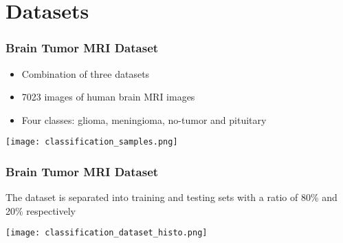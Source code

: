 \documentclass[../presentation.tex]{subfiles} %
\begin{document}
\section{Datasets}

\begin{frame}

    \frametitle{Brain Tumor MRI Dataset}

    \begin{cbox}
        \begin{itemize}
            \item Combination of three datasets
            \item 7023 images of human brain MRI images
            \item Four classes: glioma, meningioma, no-tumor and pituitary
        \end{itemize}
    \end{cbox}

    \vspace{0.2cm}

    \begin{center}
        \texttt{[image: classification\_samples.png]}
    \end{center}

\end{frame}

\begin{frame}
    
    \frametitle{Brain Tumor MRI Dataset}

    \begin{cbox}
        The dataset is separated into training and testing sets with a ratio of 80\% and 20\% respectively
    \end{cbox}

    \begin{center}
        \texttt{[image: classification\_dataset\_histo.png]}
    \end{center}

\end{frame}
\end{document}
